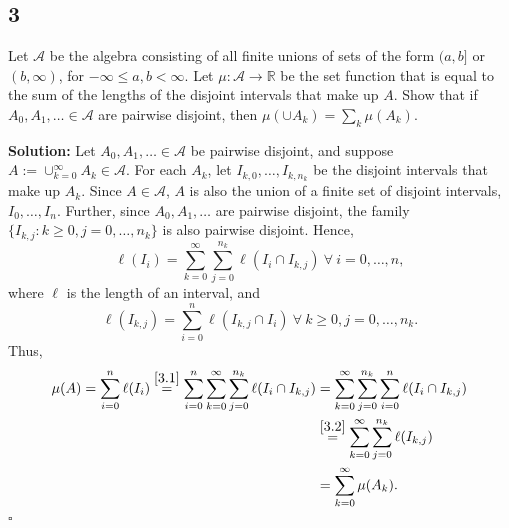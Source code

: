 \documentclass[12pt]{article}
\newcounter{ProofCounter}
\newenvironment{Solution}{\stepcounter{ProofCounter}\textbf{Solution:}}{\hfill$\square$}
\begin{document}

\subsection*{3}
\begin{tcolorbox}
  Let $\mathcal{A}$ be the algebra consisting of all finite unions of sets of the form $(a,b]$ or $(b, \infty)$, for $-\infty \leq a, b < \infty$.
  Let $\mu : \mathcal{A} \rightarrow \mathbb{R}$ be the set function that is equal to the sum of the lengths of the disjoint intervals that make up $A$.
  Show that if $A_0, A_1, \dots \in \mathcal{A}$ are pairwise disjoint, then $\mu( \cup A_k ) = \sum_k \mu(A_k)$.
\end{tcolorbox}
\begin{Solution}
  Let $A_0, A_1, \dots \in \mathcal{A}$ be pairwise disjoint, and suppose $A := \cup_{k=0}^{\infty} A_k \in \mathcal{A}$. For each $A_k$, let $I_{k,0}, \dots, I_{k,n_k}$ be the disjoint intervals that make up $A_k$. Since $A \in \mathcal{A}$, $A$ is also the union of a finite set of disjoint intervals, $I_0, \dots, I_n$.
  Further, since $A_0, A_1, \dots$ are pairwise disjoint, the family $\{ I_{k,j} : k \geq 0, j = 0, \dots, n_k \}$ is also pairwise disjoint.
  Hence,
  \begin{equation}
    \ell(I_i) = \sum_{k=0}^{\infty} \sum_{j=0}^{n_k} \ell(I_i \cap I_{k,j}) \ \forall \ i = 0, \dots, n,
    \label{3.1}
  \end{equation}
  where $\ell$ is the length of an interval, and
  \begin{equation}
    \ell(I_{k,j}) = \sum_{i=0}^{n} \ell(I_{k,j} \cap I_i) \ \forall \ k \geq 0, j = 0, \dots, n_k.
    \label{3.2}
  \end{equation}
  Thus,
  \begin{align*}
    \mu(A) = \sum_{i=0}^{n} \ell(I_i) \stackrel{\eqref{3.1}}{=} \sum_{i=0}^{n} \sum_{k=0}^{\infty} \sum_{j=0}^{n_k} \ell( I_i \cap I_{k,j}) & = \sum_{k=0}^{\infty} \sum_{j=0}^{n_k} \sum_{i=0}^{n} \ell( I_i \cap I_{k,j}) \\ 
    & \stackrel{\eqref{3.2}}{=} \sum_{k=0}^{\infty} \sum_{j=0}^{n_k} \ell( I_{k,j}) \\ 
    & = \sum_{k=0}^{\infty} \mu(A_k). \\ 
  \end{align*}
\end{Solution}
\end{document}
